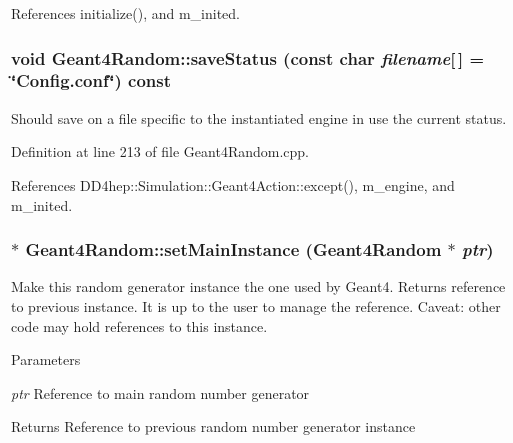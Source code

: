 References initialize(), and m\_\-inited.\hypertarget{class_d_d4hep_1_1_simulation_1_1_geant4_random_aa8f56d1e097951d747ae3251cc845992}{
\subsubsection[{saveStatus}]{\setlength{\rightskip}{0pt plus 5cm}void Geant4Random::saveStatus (const char {\em filename}\mbox{[}$\,$\mbox{]} = {\ttfamily \char`\"{}Config.conf\char`\"{}}) const}}
\label{class_d_d4hep_1_1_simulation_1_1_geant4_random_aa8f56d1e097951d747ae3251cc845992}


Should save on a file specific to the instantiated engine in use the current status. 

Definition at line 213 of file Geant4Random.cpp.

References DD4hep::Simulation::Geant4Action::except(), m\_\-engine, and m\_\-inited.\hypertarget{class_d_d4hep_1_1_simulation_1_1_geant4_random_a544fa42f6ae0d64697e366da5e1297b2}{
\subsubsection[{setMainInstance}]{ $\ast$ Geant4Random::setMainInstance ({\bf Geant4Random} $\ast$ {\em ptr})}}
\label{class_d_d4hep_1_1_simulation_1_1_geant4_random_a544fa42f6ae0d64697e366da5e1297b2}


Make this random generator instance the one used by Geant4. Returns reference to previous instance. It is up to the user to manage the reference. Caveat: other code may hold references to this instance.


\begin{DoxyParams}{Parameters}
\item[{\em ptr}]Reference to main random number generator \end{DoxyParams}
\begin{DoxyReturn}{Returns}
Reference to previous random number generator instance 
\end{DoxyReturn}



